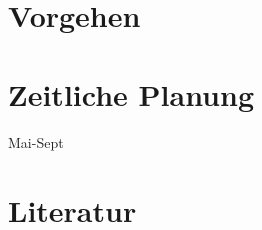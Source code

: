 \documentclass{article}
\begin{document}
\subsection{}


\section{Vorgehen}

\section{Zeitliche Planung}
Mai-Sept
\section{Literatur}
\end{document}
